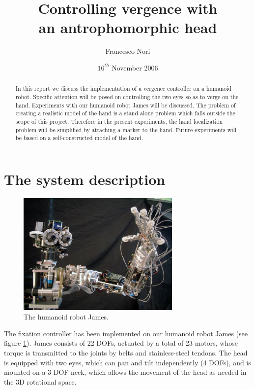 \title {Controlling vergence with \\ an antrophomorphic head}
\author{Francesco Nori}
\date{$16^{th}$ November 2006}
\maketitle

\begin{abstract}
In this report we discuss the implementation of a vergence controller on a humanoid robot. Specific attention will be posed on controlling the two eyes so as to verge on the hand. Experiments with our humanoid robot James will be discussed. The problem of creating a realistic model of the hand is a stand alone problem which falls outside the scope of this project. Therefore in the present experiments, the hand localization problem will be simplified by attaching a marker to the hand. Future experiments will be based on a self-constructed model of the hand.
\end{abstract}

\section{The system description}

\begin{figure}[h!tbp]
\centering
\includegraphics[width=80mm]{Figure/James1.eps}
\caption{The humanoid robot James.}
\label{Fig:PictureJames}
\end{figure}

The fixation controller has been implemented on our humanoid robot James (see figure \ref{Fig:PictureJames}). James consists of 22 DOFs, actuated by a total of 23 motors, whose torque is transmitted to the joints by belts and stainless-steel tendons. The head is equipped with two eyes, which can pan and tilt independently (4 DOFs), and is mounted on a 3-DOF neck, which allows the movement of the head as needed in the 3D rotational space.


